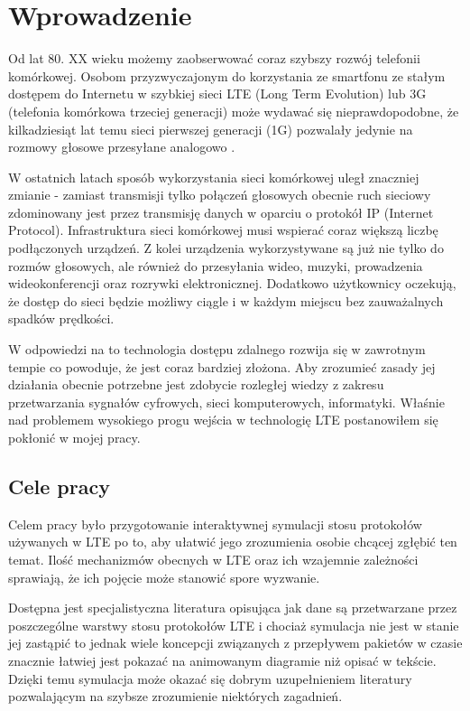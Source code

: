 \chapter{Wprowadzenie}
\label{cha:wprowadzenie}

Od lat 80. XX wieku możemy zaobserwować coraz szybszy rozwój telefonii komórkowej. Osobom przyzwyczajonym do korzystania ze smartfonu ze stałym dostępem do Internetu w szybkiej sieci LTE (Long Term Evolution) lub 3G (telefonia komórkowa trzeciej generacji) może wydawać się nieprawdopodobne, że kilkadziesiąt lat temu sieci pierwszej generacji (1G) pozwalały jedynie na rozmowy głosowe przesyłane analogowo \cite{TanWet11}.

W ostatnich latach sposób wykorzystania sieci komórkowej uległ znaczniej zmianie - zamiast transmisji tylko połączeń głosowych obecnie ruch sieciowy zdominowany jest przez transmisję danych w oparciu o protokół IP (Internet Protocol). Infrastruktura sieci komórkowej musi wspierać coraz większą liczbę podłączonych urządzeń. Z kolei urządzenia wykorzystywane są już nie tylko do rozmów głosowych, ale również do przesyłania wideo, muzyki, prowadzenia wideokonferencji oraz rozrywki elektronicznej. Dodatkowo użytkownicy oczekują, że dostęp do sieci będzie możliwy ciągle i w każdym miejscu bez zauważalnych spadków prędkości.

W odpowiedzi na to technologia dostępu zdalnego rozwija się w zawrotnym tempie co powoduje, że jest coraz bardziej złożona. Aby zrozumieć zasady jej działania obecnie potrzebne jest zdobycie rozległej wiedzy z zakresu przetwarzania sygnałów cyfrowych, sieci komputerowych, informatyki. Właśnie nad problemem wysokiego progu wejścia w technologię LTE postanowiłem się pokłonić w mojej pracy.

\section{Cele pracy}					
\label{sec:celePracy}

Celem pracy było przygotowanie interaktywnej symulacji stosu protokołów używanych w LTE po to, aby ułatwić jego zrozumienia osobie chcącej zgłębić ten temat. Ilość mechanizmów obecnych w LTE oraz ich wzajemnie zależności sprawiają, że ich pojęcie może stanowić spore wyzwanie.

Dostępna jest specjalistyczna literatura opisująca jak dane są przetwarzane przez poszczególne warstwy stosu protokołów LTE i chociaż symulacja nie jest w stanie jej zastąpić to jednak wiele koncepcji związanych z przepływem pakietów w czasie znacznie łatwiej jest pokazać na animowanym diagramie niż opisać w tekście. Dzięki temu symulacja może okazać się dobrym uzupełnieniem literatury pozwalającym na szybsze zrozumienie niektórych zagadnień.

